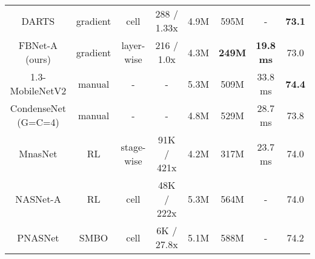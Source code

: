 \documentclass[10pt,twocolumn,letterpaper]{article}
\begin{document}
\begin{table*}[h]
\begin{tabular}{c|ccc|cccc}
DARTS  \cite{liu2018darts}                    & gradient                                                 & cell                                                    & 288 / 1.33x                                                    & 4.9M         & 595M    & -                                                      & \textbf{73.1}                                                      \\ 
FBNet-A (ours)                              & gradient                                                 & layer-wise                                              & 216 / 1.0x                                                    & 4.3M         & \textbf{249M}    & \textbf{19.8 ms}                                                & 73.0                                                      \\ \hline
1.3-MobileNetV2 \cite{sandler2018mobilenetv2} & manual                                                   & -                                                       & -                                                               & 5.3M         & 509M    & 33.8 ms                                                 & \textbf{74.4}                                                      \\
CondenseNet (G=C=4) \cite{huang2017condensenet}& manual                                                   & -                                                       & -                                                               & 4.8M         & 529M    & 28.7 ms                                               & 73.8                                                      \\
MnasNet \cite{tan2018mnasnet}                 & RL                                                       & stage-wise                                              & 91K / 421x                                      & 4.2M         & 317M    & 23.7 ms                                                & 74.0                                                      \\
NASNet-A  \cite{zoph2017learning}             & RL                                                       & cell                                                    & 48K / 222x                                       & 5.3M         & 564M    & -                                                      & 74.0                                                      \\
PNASNet \cite{liu2017progressive}             & SMBO                                                     & cell                                                    & 6K / 27.8x                                      & 5.1M         & 588M    & -                                                      & 74.2                                                      \\ 

\end{tabular}
\end{table*}
\end{document}
